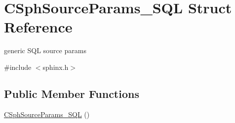 \hypertarget{structCSphSourceParams__SQL}{\section{C\-Sph\-Source\-Params\-\_\-\-S\-Q\-L Struct Reference}
\label{structCSphSourceParams__SQL}
}


generic S\-Q\-L source params  




{\ttfamily \#include $<$sphinx.\-h$>$}

\subsection*{Public Member Functions}
\begin{DoxyCompactItemize}
\item 
\hyperlink{structCSphSourceParams__SQL_ac1f14f3f4edf78d06dbdef2c4db550b6}{C\-Sph\-Source\-Params\-\_\-\-S\-Q\-L} ()
\end{DoxyCompactItemize}
